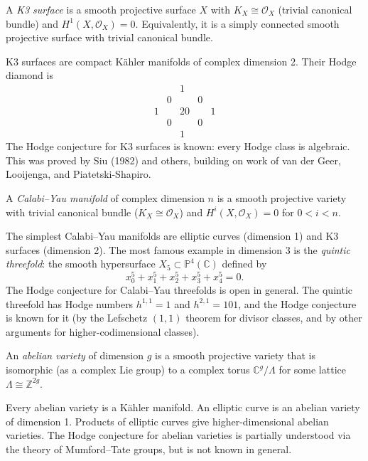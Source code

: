 \begin{definition}
A \emph{K3 surface} is a smooth projective surface $X$ with $K_X \cong \mathcal{O}_X$ (trivial canonical bundle) and $H^1(X, \mathcal{O}_X) = 0$. Equivalently, it is a simply connected smooth projective surface with trivial canonical bundle.
\end{definition}

K3 surfaces are compact K\"{a}hler manifolds of complex dimension 2. Their Hodge diamond is
\[
\begin{array}{ccccc}
 & & 1 & & \\
 & 0 & & 0 & \\
1 & & 20 & & 1 \\
 & 0 & & 0 & \\
 & & 1 & &
\end{array}
\]
The Hodge conjecture for K3 surfaces is known: every Hodge class is algebraic. This was proved by Siu (1982) and others, building on work of van der Geer, Looijenga, and Piatetski-Shapiro.

\begin{definition}
A \emph{Calabi--Yau manifold} of complex dimension $n$ is a smooth projective variety with trivial canonical bundle ($K_X \cong \mathcal{O}_X$) and $H^i(X, \mathcal{O}_X) = 0$ for $0 < i < n$.
\end{definition}

The simplest Calabi--Yau manifolds are elliptic curves (dimension 1) and K3 surfaces (dimension 2). The most famous example in dimension 3 is the \emph{quintic threefold}: the smooth hypersurface $X_5 \subset \mathbb{P}^4(\mathbb{C})$ defined by
\[
x_0^5 + x_1^5 + x_2^5 + x_3^5 + x_4^5 = 0.
\]
The Hodge conjecture for Calabi--Yau threefolds is open in general. The quintic threefold has Hodge numbers $h^{1,1} = 1$ and $h^{2,1} = 101$, and the Hodge conjecture is known for it (by the Lefschetz $(1,1)$ theorem for divisor classes, and by other arguments for higher-codimensional classes).

\begin{definition}
An \emph{abelian variety} of dimension $g$ is a smooth projective variety that is isomorphic (as a complex Lie group) to a complex torus $\mathbb{C}^g / \Lambda$ for some lattice $\Lambda \cong \mathbb{Z}^{2g}$.
\end{definition}

Every abelian variety is a K\"{a}hler manifold. An elliptic curve is an abelian variety of dimension 1. Products of elliptic curves give higher-dimensional abelian varieties. The Hodge conjecture for abelian varieties is partially understood via the theory of Mumford--Tate groups, but is not known in general.

